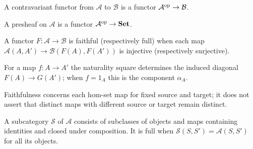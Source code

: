 \begin{definition}
\label{def:lbc-contravariant}
A contravariant functor from $\mathcal A$ to $\mathcal B$ is a functor
$\mathcal A^{\mathrm{op}}\to\mathcal B$.
\end{definition}

\begin{definition}[Presheaf]
\label{def:lbc-presheaf}
A presheaf on $\mathcal A$ is a functor $\mathcal A^{\mathrm{op}}\to\mathbf{Set}$.
\end{definition}

\begin{definition}
\label{def:lbc-full-faithful}
A functor $F:\mathcal A\to\mathcal B$ is faithful (respectively full) when
each map $\mathcal A(A,A')\to\mathcal B(F(A),F(A'))$ is injective
(respectively surjective).
\end{definition}

\begin{remark}
\label{rem:lbc-natural-diagonal}
For a map $f:A\to A'$ the naturality square determines the induced diagonal
$F(A)\to G(A')$; when $f=1_A$ this is the component $\alpha_A$.
\end{remark}

\begin{warning}
\label{warn:lbc-faithfulness}
Faithfulness concerns each hom-set map for fixed source and target; it does not
assert that distinct maps with different source or target remain distinct.
\end{warning}

\begin{definition}[Subcategory]
\label{def:lbc-subcategory}
A subcategory $\mathcal S$ of $\mathcal A$ consists of subclasses of objects
and maps containing identities and closed under composition. It is full when
$\mathcal S(S,S')=\mathcal A(S,S')$ for all its objects.
\end{definition}

